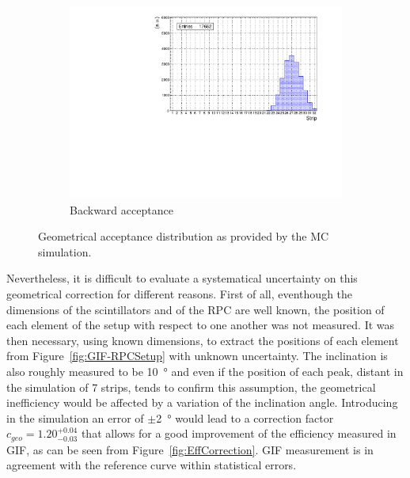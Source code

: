 \begin{figure}[H]
\begin{subfigure}{0.5\linewidth}
			\includegraphics[width = 0.7\plotwidth]{fig/chapt5/Geometrical-acceptance-backward.pdf}
			\caption{\label{fig:SimResult:C} Backward acceptance}
		\end{subfigure}
		\caption{\label{fig:SimResult} Geometrical acceptance distribution as provided by the \acl{MC} simulation.}
	\end{figure}
	
	Nevertheless, it is difficult to evaluate a systematical uncertainty on this geometrical correction for different reasons. First of all, eventhough the dimensions of the scintillators and of the RPC are well known, the position of each element of the setup with respect to one another was not measured. It was then necessary, using known dimensions, to extract the positions of each element from Figure~\ref{fig:GIF-RPCSetup} with unknown uncertainty. The inclination is also roughly measured to be \SI{10}{\degree} and even if the position of each peak, distant in the simulation of 7 strips, tends to confirm this assumption, the geometrical inefficiency would be affected by a variation of the inclination angle. Introducing in the simulation an error of $\pm$\SI{2}{\degree} would lead to a correction factor $c_{geo} = 1.20^{+0.04}_{-0.03}$ that allows for a good improvement of the efficiency measured in GIF, as can be seen from Figure~\ref{fig:EffCorrection}. GIF measurement is in agreement with the reference curve within statistical errors.


